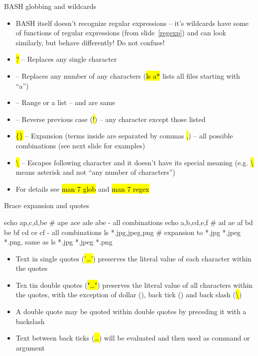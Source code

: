 \documentclass[compress, ucs, xelatex, 11pt, xcolor=svgnames,
  hyperref={
    bookmarks=true,
    unicode=true,
    colorlinks=true,
    pdftitle={Linux, command line and MetaCentrum},
    plainpages=false,
    pdfauthor={Vojtech Zeisek},
    pdfsubject={Course about use of Linux command line, writing shell scripts and using MetaCentrum of CESNET},
    pdfcreator={XeLaTeX},
    pdfkeywords={Linux, GNU, BASH, shell, command line, MetaCentrum},
    linkcolor=DarkRed,
    anchorcolor=DarkBlue,
    citecolor=Indigo,
    filecolor=NavyBlue,
    menucolor=DarkMagenta,
    urlcolor=DarkBlue,
    pdftex},
  url={hyphens, lowtilde} %
  ]{beamer}
\renewcommand{\texttt}[1]{\hl{\ttfamily #1}}
\begin{document}
\begin{frame}{BASH globbing and wildcards}
  \label{globbing}
  \begin{itemize}
    \item BASH itself doesn't recognize regular expressions -- it's wildcards have some of functions of regular expressions (from slide~\ref{regexp}) and can look similarly, but behave differently! Do not confuse!
    \item \texttt{?} -- Replaces any single character
    \item \texttt{*} -- Replaces any number of any characters (\texttt{ls a*} lists all files starting with ``a'')
    \item \texttt{[]} -- Range or a list -- \texttt{[abcdef]} and \texttt{[a-f]} are same
    \item \texttt{[!\ldots]} -- Reverse previous case (\texttt{!}) -- any character except those listed
    \item \texttt{\{\}} -- Expansion (terms inside are separated by commas \texttt{,}) -- all possible combinations (see next slide for examples)
    \item \texttt{\textbackslash} -- Escapes following character and it doesn't have its special meaning (e.g. \texttt{\textbackslash *} means asterisk \texttt{*} and not ``any number of characters'')
    \item For details see \texttt{man 7 glob} and \texttt{man 7 regex}
  \end{itemize}
\end{frame}

\begin{frame}[fragile]{Brace expansion and quotes}
  \begin{bashcode}
    echo a{p,c,d,b}e # ape ace ade abe - all combinations
    echo {a,b,c}{d,e,f} # ad ae af bd be bf cd ce cf - all combinations
    ls *.{jpg,jpeg,png} # expansion to *.jpg *.jpeg *.png, same as
    ls *.jpg *.jpeg *.png
  \end{bashcode}
  \begin{itemize}
    \item Text in single quotes (\texttt{'\ldots'}) preserves the literal value of each character within the quotes
    \item Tex tin double quotes (\texttt{"\ldots"}) preserves the literal value of all characters within the quotes, with the exception of dollar (\texttt{\textdollar}), back tick (\texttt{\textasciigrave}) and back slash (\texttt{\textbackslash})
    \item A double quote may be quoted within double quotes by preceding it with a backslash
    \item Text between back ticks (\texttt{\textasciigrave\ldots\textasciigrave}) will be evaluated and then used as command or argument
  \end{itemize}
\end{frame}
\end{document}
